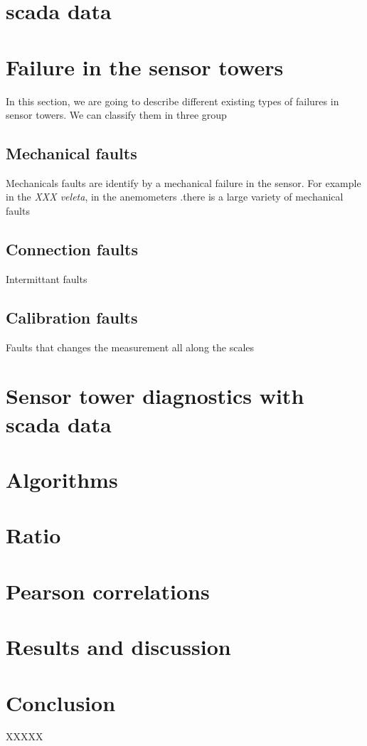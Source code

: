 \documentclass[journal]{IEEEtran}
\begin{document}
\section{scada data}
\section{Failure in the sensor towers}
In this section, we are going to describe different existing types of failures in sensor towers. We can classify them in three group
\subsection{Mechanical faults} Mechanicals faults are identify by a mechanical failure in the sensor. For example in the \emph{XXX veleta}, 
in the anemometers .there is a large variety of mechanical faults
\subsection{Connection  faults} Intermittant faults
\subsection{Calibration faults} Faults that changes the measurement all along the scales

\section{Sensor tower diagnostics with scada data}

\section{Algorithms}
\section{Ratio}
\section{Pearson correlations}
\section{Results and discussion}
\section{Conclusion}
XXXXX



\end{document}
